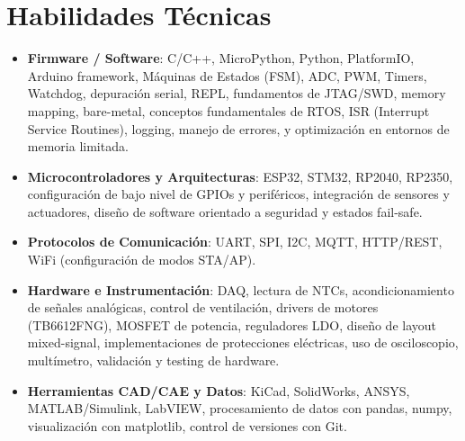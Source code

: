 \documentclass[10pt,letterpaper]{article}
\newcommand{\CVItem}[1]{\item #1}
\begin{document}
\section*{Habilidades Técnicas}
\begin{itemize}[leftmargin=*, itemsep=0pt]
    \CVItem{\textbf{Firmware / Software}: C/C++, MicroPython, Python, PlatformIO, Arduino framework, Máquinas de Estados (FSM), ADC, PWM, Timers, Watchdog, depuración serial, REPL, fundamentos de JTAG/SWD, memory mapping, bare-metal, conceptos fundamentales de RTOS, ISR (Interrupt Service Routines), logging, manejo de errores, y optimización en entornos de memoria limitada.}
    \CVItem{\textbf{Microcontroladores y Arquitecturas}: ESP32, STM32, RP2040, RP2350, configuración de bajo nivel de GPIOs y periféricos, integración de sensores y actuadores, diseño de software orientado a seguridad y estados fail-safe.}
    \CVItem{\textbf{Protocolos de Comunicación}: UART, SPI, I2C, MQTT, HTTP/REST, WiFi (configuración de modos STA/AP).}
    \CVItem{\textbf{Hardware e Instrumentación}: DAQ, lectura de NTCs, acondicionamiento de señales analógicas, control de ventilación, drivers de motores (TB6612FNG), MOSFET de potencia, reguladores LDO, diseño de layout mixed-signal, implementaciones de protecciones eléctricas, uso de osciloscopio, multímetro, validación y testing de hardware.}
    \CVItem{\textbf{Herramientas CAD/CAE y Datos}: KiCad, SolidWorks, ANSYS, MATLAB/Simulink, LabVIEW, procesamiento de datos con pandas, numpy, visualización con matplotlib, control de versiones con Git.}
\end{itemize}
\end{document}
